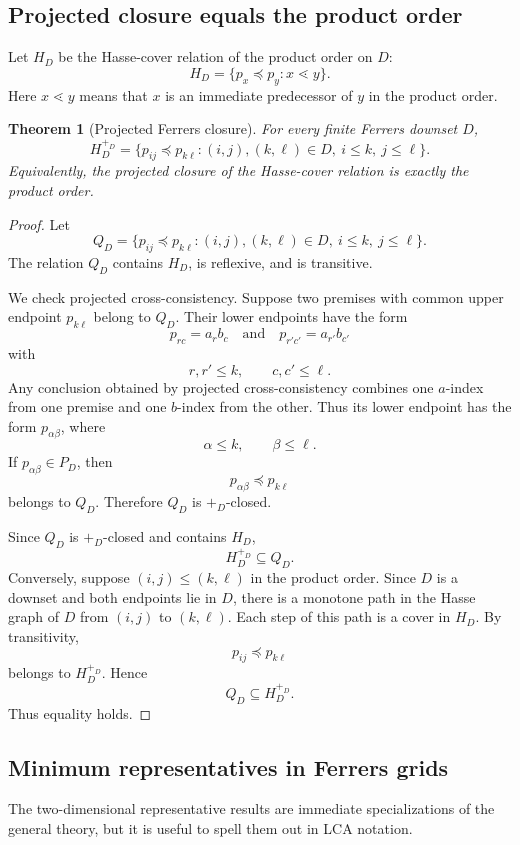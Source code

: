 \documentclass[11pt]{article}
\newtheorem{theorem}{Theorem}[section]
\begin{document}
\subsection{Projected closure equals the product order}

Let $H_D$ be the Hasse-cover relation of the product order on $D$:
\[
H_D=\{p_x\preceq p_y:x\lessdot y\}.
\]
Here $x\lessdot y$ means that $x$ is an immediate predecessor of $y$ in the product order.

\begin{theorem}[Projected Ferrers closure]
For every finite Ferrers downset $D$,
\[
H_D^{+_D}
=
\{p_{ij}\preceq p_{k\ell}:(i,j),(k,\ell)\in D,\ i\le k,\ j\le \ell\}.
\]
Equivalently, the projected closure of the Hasse-cover relation is exactly the product order.
\end{theorem}

\begin{proof}
Let
\[
Q_D=\{p_{ij}\preceq p_{k\ell}:(i,j),(k,\ell)\in D,\ i\le k,\ j\le \ell\}.
\]
The relation $Q_D$ contains $H_D$, is reflexive, and is transitive.

We check projected cross-consistency. Suppose two premises with common upper endpoint $p_{k\ell}$ belong to $Q_D$. Their lower endpoints have the form
\[
p_{rc}=a_r b_c
\quad\text{and}\quad
p_{r'c'}=a_{r'} b_{c'}
\]
with
\[
r,r'\le k,
\qquad
c,c'\le \ell.
\]
Any conclusion obtained by projected cross-consistency combines one $a$-index from one premise and one $b$-index from the other. Thus its lower endpoint has the form $p_{\alpha\beta}$, where
\[
\alpha\le k,\qquad \beta\le \ell.
\]
If $p_{\alpha\beta}\in P_D$, then
\[
p_{\alpha\beta}\preceq p_{k\ell}
\]
belongs to $Q_D$. Therefore $Q_D$ is $+_D$-closed.

Since $Q_D$ is $+_D$-closed and contains $H_D$,
\[
H_D^{+_D}\subseteq Q_D.
\]
Conversely, suppose $(i,j)\le(k,\ell)$ in the product order. Since $D$ is a downset and both endpoints lie in $D$, there is a monotone path in the Hasse graph of $D$ from $(i,j)$ to $(k,\ell)$. Each step of this path is a cover in $H_D$. By transitivity,
\[
p_{ij}\preceq p_{k\ell}
\]
belongs to $H_D^{+_D}$. Hence
\[
Q_D\subseteq H_D^{+_D}.
\]
Thus equality holds.
\end{proof}

\subsection{Minimum representatives in Ferrers grids}

The two-dimensional representative results are immediate specializations of the general theory, but it is useful to spell them out in LCA notation.
\end{document}
